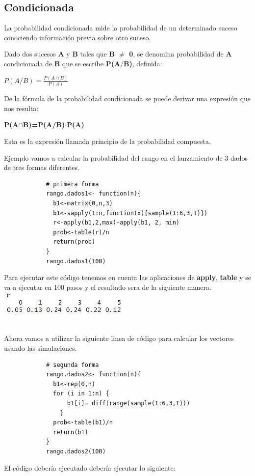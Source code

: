 \documentclass[12pt,hidelinks]{article}
\begin{document}
	\subsection{Condicionada} 
	    La probabilidad condicionada mide la probabilidad de un determinado suceso conociendo información previa sobre otro suceso.
	    
	    Dado dos sucesos \textbf{A} y \textbf{B} tales que \textbf{B $\neq$ 0}, se denomina probabilidad de \textbf{A} condicionada de \textbf{B} que se escribe \textbf{P(A$/$B)}, definida:
	    
	    \begin{center}
	        \textbf{$P(A/B)=\frac{P(A\cap B)}{P(A)}$}
	    \end{center}
	    De la fórmula de la probabilidad condicionada se puede derivar una expresión que nos resulta:
	    \begin{center}
	        \textbf{P(A$\cap$B)=P(A/B)$\cdot$P(A)}
	    \end{center}
	    Esta es la expresión llamada principio de la probabilidad compuesta.
	    
	    Ejemplo vamos a calcular la probabilidad
	    del rango en el lanzamiento de 3 dados de tres formas diferentes.
		\begin{lstlisting}
		    # primera forma
            rango.dados1<- function(n){
              b1<-matrix(0,n,3)
              b1<-sapply(1:n,function(x){sample(1:6,3,T)})
              r<-apply(b1,2,max)-apply(b1, 2, min)
              prob<-table(r)/n
              return(prob)
            }
            rango.dados1(100)
        \end{lstlisting} 
        Para ejecutar este código tenemos en cuenta las aplicaciones de \textbf{apply}, \textbf{table} y se va a ejecutar en 100 pasos y el resultado sera de la siguiente manera.
        \\
            \centering
            \includegraphics[scale=0.4]{probabilidad_condicionada.jpeg}\\
            \centering
            \caption{}\\
        Ahora vamos a utilizar la siguiente linea de código para calcular los vectores usando las simulaciones.\\
            
        \begin{lstlisting}
            # segunda forma 
            rango.dados2<- function(n){
              b1<-rep(0,n)
              for (i in 1:n) {
                  b1[i]= diff(range(sample(1:6,3,T)))
                }
              prob<-table(b1)/n
              return(b1)
            }
            rango.dados2(100)
        \end{lstlisting}
        El código debería ejecutado debería ejecutar lo siguiente:\\
        
\end{document}
